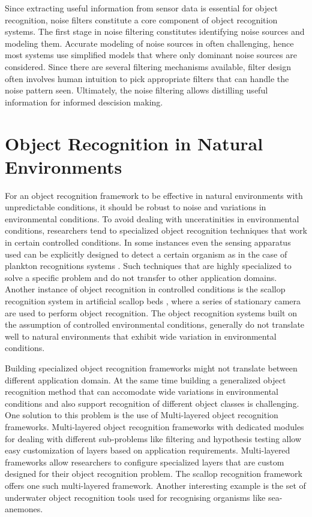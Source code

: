 \documentclass {udthesis}
\begin{document}
Since extracting useful information from sensor data is essential for object recognition, noise filters constitute a core component of object recognition systems. The first stage in noise filtering constitutes identifying noise sources and modeling them. Accurate modeling of noise sources in often challenging, hence most systems use simplified models that where only dominant noise sources are considered. Since there are several filtering mechanisms available, filter design often involves human intuition to pick appropriate filters that can handle the noise pattern seen. Ultimately, the noise filtering allows distilling useful information for informed descision making.

\section{Object Recognition in Natural Environments}

For an object recognition framework to be effective in natural environments with unpredictable conditions, it
should be robust to noise and variations in environmental conditions. 
To avoid dealing with unceratinities in environmental conditions, researchers tend to specialized object recognition techniques that work in certain controlled conditions. In some instances even the sensing apparatus used can be explicitly designed to detect a certain organism as in the case of plankton 
recognitions systems \cite{mcgavin_plankton, stelzer_rotifier}. Such techniques that are highly specialized to solve a specific problem 
and do not transfer to other application domains. Another instance of object recognition in controlled conditions is the scallop recognition system in artificial scallop beds \cite{enomoto9,enomoto10}, where a series of stationary camera are used to perform object recognition. The object recognition systems built on the assumption of controlled environmental conditions, generally do not translate well to natural environments that exhibit wide variation in environmental conditions.

Building specialized object recognition frameworks might not translate between different application domain. At the same time building a generalized object 
recognition method that can accomodate wide variations in environmental conditions and also support recognition of different object classes is challenging. 
One solution to this problem is the use of Multi-layered object recognition frameworks. Multi-layered object recognition frameworks with dedicated modules for dealing with different sub-problems like filtering and hypothesis testing allow easy customization of layers based on application requirements. 
Multi-layered frameworks allow researchers to configure specialized layers that are custom designed for their object recognition problem. The scallop
recognition framework \cite{prasanna_aslo, prasanna_igi} offers one such multi-layered framework. Another interesting example is the set of underwater object recognition tools \cite{schoening} used for recognising organisms like sea-anemones.
\end{document}
